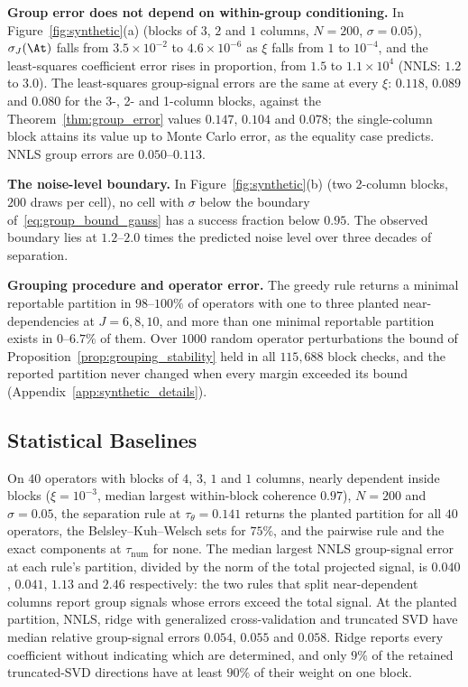 \noindent\textbf{Group error does not depend on within-group conditioning.}
In Figure~\ref{fig:synthetic}(a) (blocks of \(3\), \(2\) and \(1\) columns, \(N=200\),
\(\sigma=0.05\)), \(\sigma_J(\At)\) falls from \(3.5\times10^{-2}\) to
\(4.6\times10^{-6}\) as \(\xi\) falls from \(1\) to \(10^{-4}\), and the least-squares
coefficient error rises in proportion, from \(1.5\) to \(1.1\times10^4\) (NNLS: \(1.2\)
to \(3.0\)).  The least-squares group-signal errors are the same at every \(\xi\):
\(0.118\), \(0.089\) and \(0.080\) for the 3-, 2- and 1-column blocks, against the
Theorem~\ref{thm:group_error} values \(0.147\), \(0.104\) and \(0.078\); the
single-column block attains its value up to Monte Carlo error, as the equality case
predicts.  NNLS group errors are \(0.050\)--\(0.113\).

\noindent\textbf{The noise-level boundary.}
In Figure~\ref{fig:synthetic}(b) (two 2-column blocks, \(200\) draws per cell), no
cell with \(\sigma\) below the boundary of~\eqref{eq:group_bound_gauss} has a success
fraction below \(0.95\).  The observed boundary lies at \(1.2\)--\(2.0\) times the
predicted noise level over three decades of separation.

\noindent\textbf{Grouping procedure and operator error.}
The greedy rule returns a minimal reportable partition in \(98\)--\(100\%\) of
operators with one to three planted near-dependencies at \(J=6,8,10\), and more than
one minimal reportable partition exists in \(0\)--\(6.7\%\) of them.  Over \(1000\)
random operator perturbations the bound of Proposition~\ref{prop:grouping_stability}
held in all \(115{,}688\) block checks, and the reported partition never changed when
every margin exceeded its bound (Appendix~\ref{app:synthetic_details}).

\subsection{Statistical Baselines}
\label{subsec:statistical_baselines}

On \(40\) operators with blocks of \(4\), \(3\), \(1\) and \(1\) columns, nearly
dependent inside blocks (\(\xi=10^{-3}\), median largest within-block coherence
\(0.97\)), \(N=200\) and \(\sigma=0.05\), the separation rule at \(\tau_\theta=0.141\)
returns the planted partition for all \(40\) operators, the Belsley--Kuh--Welsch sets
for \(75\%\), and the pairwise rule and the exact components at
\(\tau_{\mathrm{num}}\) for none.  The median largest NNLS group-signal error at each
rule's partition, divided by the norm of the total projected signal, is \(0.040\),
\(0.041\), \(1.13\) and \(2.46\) respectively: the two rules that split near-dependent
columns report group signals whose errors exceed the total signal.  At the planted
partition, NNLS, ridge with generalized cross-validation \citep{golub1979generalized}
and truncated SVD \citep{hansen1987truncated} have median relative group-signal errors
\(0.054\), \(0.055\) and \(0.058\).  Ridge reports every coefficient without indicating
which are determined, and only \(9\%\) of the retained truncated-SVD directions have
at least \(90\%\) of their weight on one block.


